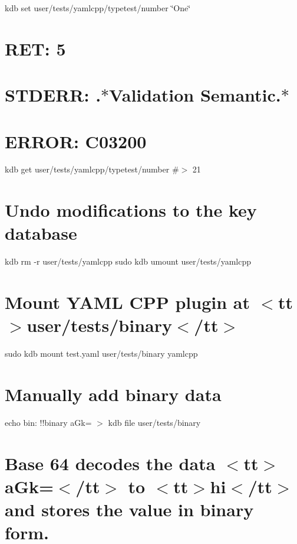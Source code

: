 kdb set user/tests/yamlcpp/typetest/number \char`\"{}\+One\char`\"{} \hypertarget{autotoc_md780_autotoc_md828}{}\section{R\+E\+T\+: 5}\label{autotoc_md780_autotoc_md828}
\hypertarget{autotoc_md780_autotoc_md829}{}\section{S\+T\+D\+E\+R\+R\+: .$\ast$\+Validation Semantic.$\ast$}\label{autotoc_md780_autotoc_md829}
\hypertarget{autotoc_md780_autotoc_md830}{}\section{E\+R\+R\+O\+R\+: C03200}\label{autotoc_md780_autotoc_md830}
kdb get user/tests/yamlcpp/typetest/number \#$>$ 21\hypertarget{autotoc_md780_autotoc_md831}{}\section{Undo modifications to the key database}\label{autotoc_md780_autotoc_md831}
kdb rm -\/r user/tests/yamlcpp sudo kdb umount user/tests/yamlcpp 
\begin{DoxyCode}{0}
\DoxyCodeLine{}
\end{DoxyCode}
 \hypertarget{autotoc_md780_autotoc_md832}{}\section{Mount Y\+A\+M\+L C\+P\+P plugin at $<$tt$>$user/tests/binary$<$/tt$>$}\label{autotoc_md780_autotoc_md832}
sudo kdb mount test.\+yaml user/tests/binary yamlcpp \hypertarget{autotoc_md780_autotoc_md833}{}\section{Manually add binary data}\label{autotoc_md780_autotoc_md833}
echo \textquotesingle{}bin\+: !!binary a\+Gk=\textquotesingle{} $>$ {\ttfamily kdb file user/tests/binary}\hypertarget{autotoc_md780_autotoc_md834}{}\section{Base 64 decodes the data $<$tt$>$a\+Gk=$<$/tt$>$ to $<$tt$>$hi$<$/tt$>$ and stores the value in binary form.}\label{autotoc_md780_autotoc_md834}
